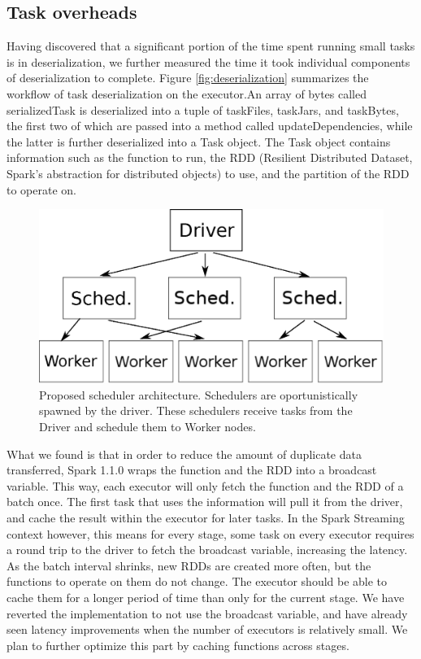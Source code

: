 \subsection{Task overheads}
Having discovered that a significant portion of the time spent running small tasks is in deserialization, we further measured the time it took individual components of deserialization to complete. Figure \ref{fig:deserialization} summarizes the workflow of task deserialization on the executor.An array of bytes called serializedTask is deserialized into a tuple of taskFiles, taskJars, and taskBytes, the first two of which are passed into a method called updateDependencies, while the latter is further deserialized into a Task object. The Task object contains information such as the function to run, the RDD (Resilient Distributed Dataset, Spark's abstraction for distributed objects) to use, and the partition of the RDD to operate on.


\begin{figure}[t!]
  \begin{center}
    \includegraphics[scale=0.45]{scheduler_architecture.eps}
  \end{center}
  \caption{Proposed scheduler architecture. Schedulers are oportunistically spawned by the driver. These schedulers receive tasks from the Driver and schedule them to Worker nodes.}
  \label{fig:schedarch}
\end{figure}

What we found is that in order to reduce the amount of duplicate data transferred, Spark 1.1.0 wraps the function and the RDD into a broadcast variable. This way, each executor will only fetch the function and the RDD of a batch once. The first task that uses the information will pull it from the driver, and cache the result within the executor for later tasks. In the Spark Streaming context however, this means for every stage, some task on every executor requires a round trip to the driver to fetch the broadcast variable, increasing the latency. As the batch interval shrinks, new RDDs are created more often, but the functions to operate on them do not change. The executor should be able to cache them for a longer period of time than only for the current stage. We have reverted the implementation to not use the broadcast variable, and have already seen latency improvements when the number of executors is relatively small. We plan to further optimize this part by caching functions across stages.

